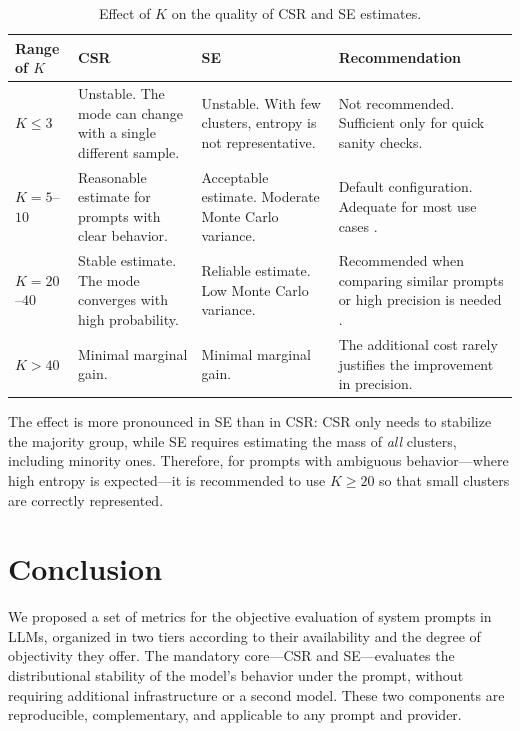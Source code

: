\documentclass[11pt,a4paper]{article}
\begin{document}
\begin{table}[h]
\centering
\caption{Effect of $K$ on the quality of CSR and SE estimates.}
\label{tab:k}
\begin{tabular}{p{2cm} p{3.5cm} p{3.5cm} p{3.5cm}}
\toprule
Range of $K$ & CSR & SE & Recommendation \\
\midrule
$K \leq 3$ &
Unstable. The mode can change with a single different sample. &
Unstable. With few clusters, entropy is not representative. &
Not recommended. Sufficient only for quick sanity checks. \\
\addlinespace
$K = 5$--$10$ &
Reasonable estimate for prompts with clear behavior. &
Acceptable estimate. Moderate Monte Carlo variance. &
Default configuration. Adequate for most use cases \citep{glape2024}. \\
\addlinespace
$K = 20$--$40$ &
Stable estimate. The mode converges with high probability. &
Reliable estimate. Low Monte Carlo variance. &
Recommended when comparing similar prompts or high precision is needed \citep{selfconsistency2023}. \\
\addlinespace
$K > 40$ &
Minimal marginal gain. &
Minimal marginal gain. &
The additional cost rarely justifies the improvement in precision. \\
\bottomrule
\end{tabular}
\end{table}

\noindent The effect is more pronounced in SE than in CSR: CSR only needs to stabilize the majority group, while SE requires estimating the mass of \textit{all} clusters, including minority ones. Therefore, for prompts with ambiguous behavior—where high entropy is expected—it is recommended to use $K \geq 20$ so that small clusters are correctly represented.

\section{Conclusion}

We proposed a set of metrics for the objective evaluation of system prompts in LLMs, organized in two tiers according to their availability and the degree of objectivity they offer. The mandatory core—CSR and SE—evaluates the distributional stability of the model's behavior under the prompt, without requiring additional infrastructure or a second model. These two components are reproducible, complementary, and applicable to any prompt and provider.
\end{document}
